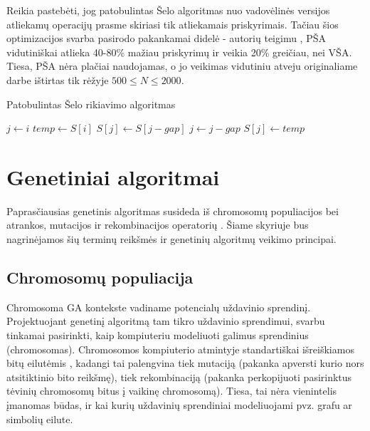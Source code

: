 \documentclass{VUMIFInfKursinis}
\begin{document}
Reikia pastebėti, jog patobulintas Šelo algoritmas nuo vadovėlinės versijos atliekamų operacijų prasme skiriasi tik
atliekamais priskyrimais.
Tačiau šios optimizacijos svarba pasirodo pakankamai didelė -
autorių teigimu \cite{Radavičius_Baranauskas_2013}, PŠA vidutiniškai atlieka 40-80\% mažiau priskyrimų ir veikia 20\% greičiau, nei VŠA.
Tiesa, PŠA nėra plačiai naudojamas, o jo veikimas vidutiniu atveju originaliame darbe ištirtas tik rėžyje $500 \leq N \leq 2000$.

\begin{algorithm}[H]
  \caption{Patobulintas Šelo rikiavimo algoritmas}\label{alg:iss}
  \begin{algorithmic}[1]
      \label{alg:iss:check}
        \State $j\gets i$\label{alg:iss:inner:start}
        \State $temp\gets S[i]$
        \Repeat\label{alg:iss:loop:start}
          \State $S[j]\gets S[j - gap]$
          \State $j\gets j-gap$
        \label{alg:iss:loop:end}
        \State $S[j]\gets temp$\label{alg:iss:inner:end}
      \EndIf
    \EndFor
  \EndFor
  \end{algorithmic}
\end{algorithm}

\section{Genetiniai algoritmai}

Paprasčiausias genetinis algoritmas susideda iš chromosomų populiacijos bei atrankos, mutacijos ir rekombinacijos operatorių \cite{simpson1999faster}.
Šiame skyriuje bus nagrinėjamos šių terminų reikšmės ir genetinių algoritmų veikimo principai.

\subsection{Chromosomų populiacija}

Chromosoma GA kontekste vadiname potencialų uždavinio sprendinį.
Projektuojant genetinį algoritmą tam tikro uždavinio sprendimui, svarbu tinkamai pasirinkti,
kaip kompiuteriu modeliuoti galimus sprendinius (chromosomas).
Chromosomos kompiuterio atmintyje standartiškai išreiškiamos bitų eilutėmis \cite{whitley1994genetic},
kadangi tai palengvina tiek mutaciją (pakanka apversti kurio nors atsitiktinio bito reikšmę),
tiek rekombinaciją (pakanka perkopijuoti pasirinktus tėvinių chromosomų bitus į vaikinę chromosomą).
Tiesa, tai nėra vienintelis įmanomas būdas, ir kai kurių uždavinių sprendiniai modeliuojami pvz. grafu ar simbolių eilute.
\end{document}
